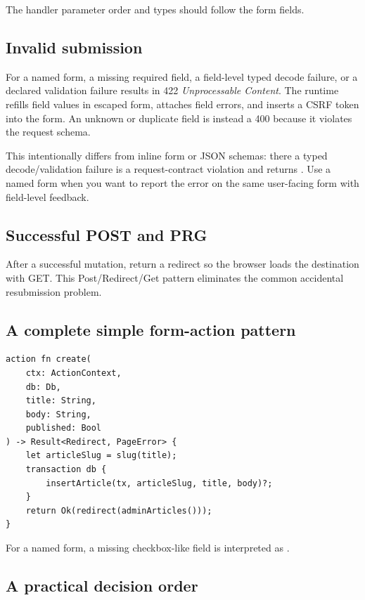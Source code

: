 The handler parameter order and types should follow the form fields.

\subsection*{Invalid submission}

For a named form, a missing required field, a field-level typed decode failure, or a declared validation failure results in 422 \emph{Unprocessable Content}. The runtime refills field values in escaped form, attaches field errors, and inserts a CSRF token into the form. An unknown or duplicate field is instead a 400 because it violates the request schema.

This intentionally differs from inline form or JSON schemas: there a typed decode/validation failure is a request-contract violation and returns . Use a named form when you want to report the error on the same user-facing form with field-level feedback.

\subsection*{Successful POST and PRG}

After a successful mutation, return a redirect so the browser loads the destination with GET. This Post/Redirect/Get pattern eliminates the common accidental resubmission problem.

\subsection*{A complete simple form-action pattern}

\begin{lstlisting}[language=RWLang]
action fn create(
    ctx: ActionContext,
    db: Db,
    title: String,
    body: String,
    published: Bool
) -> Result<Redirect, PageError> {
    let articleSlug = slug(title);
    transaction db {
        insertArticle(tx, articleSlug, title, body)?;
    }
    return Ok(redirect(adminArticles()));
}
\end{lstlisting}

For a named form, a missing checkbox-like  field is interpreted as .

\subsection*{A practical decision order}

